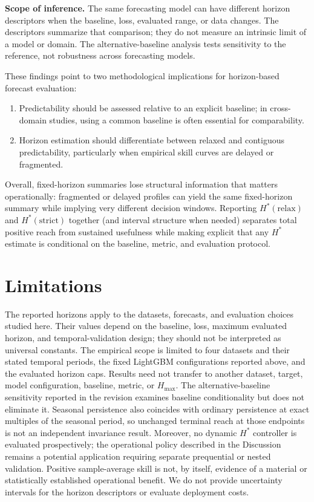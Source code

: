 \documentclass[pdflatex]{sn-jnl}
\begin{document}
\textbf{Scope of inference.} The same forecasting model can have different
horizon descriptors when the baseline, loss, evaluated range, or data
changes. The descriptors summarize that comparison; they do not measure
an intrinsic limit of a model or domain. The alternative-baseline analysis
tests sensitivity to the reference, not robustness across forecasting models.

These findings point to two methodological implications for horizon-based forecast evaluation:
\begin{enumerate}
  \item Predictability should be assessed relative to an explicit baseline; in cross-domain studies, using a common baseline is often essential for comparability.
  \item Horizon estimation should differentiate between relaxed and contiguous predictability, particularly when empirical skill curves are delayed or fragmented.
\end{enumerate}

Overall, fixed-horizon summaries lose structural information that matters operationally: fragmented or delayed profiles can yield the same fixed-horizon summary while implying very different decision windows. Reporting $H^*(\mathrm{relax})$ and $H^*(\mathrm{strict})$ together (and interval structure when needed) separates total positive reach from sustained usefulness while making explicit that any $H^*$ estimate is conditional on the baseline, metric, and evaluation protocol.

\section{Limitations}

The reported horizons apply to the datasets, forecasts, and evaluation
choices studied here. Their values depend on the baseline, loss,
maximum evaluated horizon, and temporal-validation design; they should
not be interpreted as universal constants.
The empirical scope is limited to four datasets and their stated temporal
periods, the fixed LightGBM configurations reported above, and the evaluated
horizon caps. Results need not transfer to another dataset, target, model
configuration, baseline, metric, or $H_{\max}$. The alternative-baseline
sensitivity reported in the revision examines baseline conditionality but
does not eliminate it. Seasonal persistence also coincides with ordinary
persistence at exact multiples of the seasonal period, so unchanged terminal
reach at those endpoints is not an independent invariance result. Moreover, no dynamic $H^*$ controller is evaluated
prospectively; the operational policy described in the Discussion remains a
potential application requiring separate prequential or nested validation.
Positive sample-average skill is not, by itself, evidence of a material or
statistically established operational benefit. We do not provide uncertainty
intervals for the horizon descriptors or evaluate deployment costs.
\end{document}
